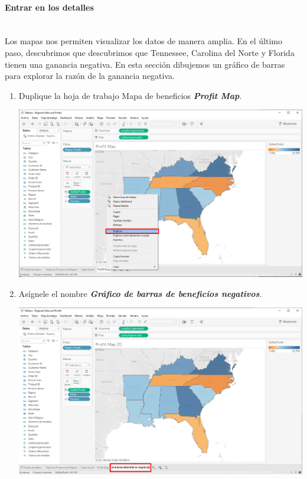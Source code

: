 \documentclass[12pt,letterpaper]{article}
\begin{document}
    \paragraph{\large Entrar en los detalles\\ \\}
    Los mapas nos permiten visualizar los datos de manera amplia. En el último paso, descubrimos que descubrimos que Tennessee, Carolina del Norte y Florida tienen una ganancia negativa. En esta sección dibujemos un gráfico de barras para explorar la razón de la ganancia negativa.
    \begin{enumerate}
        \item Duplique la hoja de trabajo Mapa de beneficios \textit{\textbf{Profit Map}}.
        \begin{center}
            \includegraphics[width=15cm]{./img/img41.png}
        \end{center}
        \item Asígnele el nombre \textit{\textbf{Gráfico de barras de beneficios negativos}}.
        \begin{center}
            \includegraphics[width=15cm]{./img/img42.png}

\end{center}
\end{enumerate}
\end{document}
